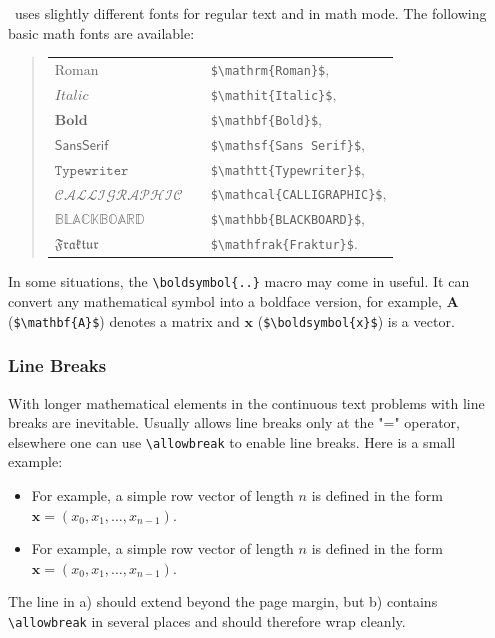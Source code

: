 \latex\ uses slightly different fonts for regular text and in math mode.
The following basic math fonts are available:
%
\begin{quote}
    \begin{tabular}{lcl}
        $\mathrm{Roman}$      & & \verb!$\mathrm{Roman}$!,      \\
				$\mathit{Italic}$     & & \verb!$\mathit{Italic}$!,      \\
				$\mathbf{Bold}$     	& & \verb!$\mathbf{Bold}$!,      \\
        $\mathsf{Sans Serif}$ & & \verb!$\mathsf{Sans Serif}$!, \\
        $\mathtt{Typewriter}$ & & \verb!$\mathtt{Typewriter}$!, \\
				$\mathcal{CALLIGRAPHIC}$ & & \verb!$\mathcal{CALLIGRAPHIC}$!,\\
				$\mathbb{BLACKBOARD}$ & & \verb!$\mathbb{BLACKBOARD}$!,\\
				$\mathfrak{Fraktur}$ & & \verb!$\mathfrak{Fraktur}$!.
    \end{tabular}
\end{quote}
%
In some situations, the \verb!\boldsymbol{..}! macro may come in useful. It can 
convert any mathematical symbol into a boldface version, for example,
$\mathbf{A}$ (\verb!$\mathbf{A}$!) denotes a matrix and $\boldsymbol{x}$ 
(\verb!$\boldsymbol{x}$!) is a vector.


\subsubsection{Line Breaks}

With longer mathematical elements in the continuous text problems with line breaks 
are inevitable. Usually \latex allows line breaks only at the "=" operator, 
elsewhere one can use \verb|\allowbreak| to enable line breaks. Here is a small
example:
%
\begin{itemize}
	\item[a)] For example, a simple row vector of length $n$ is defined in the form
	$\boldsymbol{x} = (x_0, x_1, \ldots, x_{n-1})$.
	\item[b)] For example, a simple row vector of length $n$ is defined in the form
	$\boldsymbol{x} = (x_0,\allowbreak x_1,\allowbreak\ldots,\allowbreak
	x_{n-1})$.
\end{itemize}
%
The line in a) should extend beyond the page margin, but b) contains 
\verb|\allowbreak| in several places and should therefore wrap cleanly.


